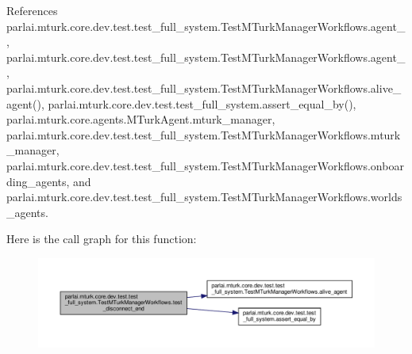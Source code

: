 References parlai.\+mturk.\+core.\+dev.\+test.\+test\+\_\+full\+\_\+system.\+Test\+M\+Turk\+Manager\+Workflows.\+agent\+\_, parlai.\+mturk.\+core.\+dev.\+test.\+test\+\_\+full\+\_\+system.\+Test\+M\+Turk\+Manager\+Workflows.\+agent\+\_, parlai.\+mturk.\+core.\+dev.\+test.\+test\+\_\+full\+\_\+system.\+Test\+M\+Turk\+Manager\+Workflows.\+alive\+\_\+agent(), parlai.\+mturk.\+core.\+dev.\+test.\+test\+\_\+full\+\_\+system.\+assert\+\_\+equal\+\_\+by(), parlai.\+mturk.\+core.\+agents.\+M\+Turk\+Agent.\+mturk\+\_\+manager, parlai.\+mturk.\+core.\+dev.\+test.\+test\+\_\+full\+\_\+system.\+Test\+M\+Turk\+Manager\+Workflows.\+mturk\+\_\+manager, parlai.\+mturk.\+core.\+dev.\+test.\+test\+\_\+full\+\_\+system.\+Test\+M\+Turk\+Manager\+Workflows.\+onboarding\+\_\+agents, and parlai.\+mturk.\+core.\+dev.\+test.\+test\+\_\+full\+\_\+system.\+Test\+M\+Turk\+Manager\+Workflows.\+worlds\+\_\+agents.

Here is the call graph for this function\+:
\nopagebreak
\begin{figure}[H]
\begin{center}
\leavevmode
\includegraphics[width=350pt]{classparlai_1_1mturk_1_1core_1_1dev_1_1test_1_1test__full__system_1_1TestMTurkManagerWorkflows_ae7c5a42a3742d9ed616af725f87192bf_cgraph}
\end{center}
\end{figure}
\mbox{\label{classparlai_1_1mturk_1_1core_1_1dev_1_1test_1_1test__full__system_1_1TestMTurkManagerWorkflows_ad1c8b65395e4d230f2289a0c95da5da0}} 
